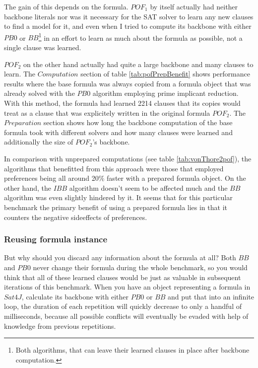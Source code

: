 The gain of this depends on the formula. $POF_1$ by itself actually had neither backbone literals %
nor was it necessary for the SAT solver to learn any new clauses to find a model for it, and even when I tried to compute its backbone with either $PB0$ or $BB$\footnote{Both algorithms, that can leave their learned clauses in place after backbone computation.} in an effort to learn as much about the formula as possible, not a single clause was learned.

$POF_2$ on the other hand actually had quite a large backbone and many clauses to learn. The $Computation$ section of table \ref{tab:pofPrepBenefit} shows performance results where the base formula was always copied from a formula object that was already solved with the $PB0$ algorithm employing prime implicant reduction. With this method, the formula had learned 2214 clauses that its copies would treat as a clause that was explicitely written in the original formula $POF_2$. The $Preparation$ section shows how long the backbone computation of the base formula took with different solvers and how many clauses were learned and additionally the size of $POF_2$'s backbone.

In comparison with unprepared computations (see table \ref{tab:vonThore2pof}), the algorithms that benefitted from this approach were those that employed preferences being all around 20\% faster with a prepared formula object. On the other hand, the $IBB$ algorithm doesn't seem to be affected much and the $BB$ algorithm was even slightly hindered by it. It seems that for this particular benchmark the primary benefit of using a prepared formula lies in that it counters the negative sideeffects of preferences.




\subsubsection{Reusing formula instance}
But why should you discard any information about the formula at all? Both $BB$ and $PB0$ never change their formula during the whole benchmark, so you would think that all of these learned clauses would be just as valuable in subsequent iterations of this benchmark. When you have an object representing a formula in $Sat4J$, calculate its backbone with either $PB0$ or $BB$ and put that into an infinite loop, the duration of each repetition will quickly decrease to only a handful of milliseconds, because all possible conflicts will eventually be evaded with help of knowledge from previous repetitions.


